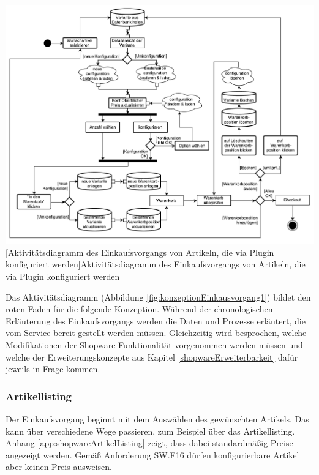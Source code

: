 \documentclass[11pt, a4paper, titlepage, listof=totoc, bibliography=totoc, index=totoc, twoside, openright, headings=normal]{scrreprt}
\begin{document}
\vspace{1em}
\begin{minipage}{\linewidth}
	\centering
	\includegraphics[width=1\linewidth]{Abbildungen/konzeptionEinkausvorgang1.pdf}
	[Aktivitätsdiagramm des Einkaufsvorgangs von Artikeln, die via Plugin konfiguriert werden]{Aktivitätsdiagramm des Einkaufsvorgangs von Artikeln, die via Plugin konfiguriert werden}
	\label{fig:konzeptionEinkausvorgang1}
\end{minipage}
\vspace{0.3em}

Das Aktivitätsdiagramm (Abbildung \ref{fig:konzeptionEinkausvorgang1}) bildet den \glqq roten Faden\grqq{} für die folgende Konzeption. Während der chronologischen Erläuterung des Einkaufsvorgangs werden die Daten und Prozesse erläutert, die vom Service bereit gestellt werden müssen. Gleichzeitig wird besprochen, welche Modifikationen der Shopware-Funktionalität vorgenommen werden müssen und welche der Erweiterungskonzepte aus Kapitel \ref{shopwareErweiterbarkeit} dafür jeweils in Frage kommen.

\subsubsection*{Artikellisting}
Der Einkaufsvorgang beginnt mit dem Auswählen des gewünschten Artikels. Das kann über verschiedene Wege passieren, zum Beispiel über das Artikellisting. Anhang \ref{app:shopwareArtikelListing} zeigt, dass dabei standardmäßig Preise angezeigt werden. Gemäß Anforderung SW.F16 dürfen konfigurierbare Artikel aber keinen Preis ausweisen.
\end{document}
